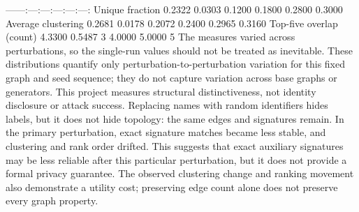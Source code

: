 {}\markdownRendererPipe{}---\markdownRendererPipe{}---:\markdownRendererPipe{}---:\markdownRendererPipe{}---:\markdownRendererPipe{}---:\markdownRendererPipe{}---:\markdownRendererPipe{}---:\markdownRendererPipe{}\markdownRendererSoftLineBreak
{}\markdownRendererPipe{} Unique fraction \markdownRendererPipe{} 0.2322 \markdownRendererPipe{} 0.0303 \markdownRendererPipe{} 0.1200 \markdownRendererPipe{} 0.1800 \markdownRendererPipe{} 0.2800 \markdownRendererPipe{} 0.3000 \markdownRendererPipe{}\markdownRendererSoftLineBreak
{}\markdownRendererPipe{} Average clustering \markdownRendererPipe{} 0.2681 \markdownRendererPipe{} 0.0178 \markdownRendererPipe{} 0.2072 \markdownRendererPipe{} 0.2400 \markdownRendererPipe{} 0.2965 \markdownRendererPipe{} 0.3160 \markdownRendererPipe{}\markdownRendererSoftLineBreak
{}\markdownRendererPipe{} Top-five overlap (count) \markdownRendererPipe{} 4.3300 \markdownRendererPipe{} 0.5487 \markdownRendererPipe{} 3 \markdownRendererPipe{} 4.0000 \markdownRendererPipe{} 5.0000 \markdownRendererPipe{} 5 \markdownRendererPipe{}\markdownRendererParagraphSeparator
{}The measures varied across perturbations, so the single-run values should not be treated as inevitable. These distributions quantify only perturbation-to-perturbation variation for this fixed graph and seed sequence; they do not capture variation across base graphs or generators.\markdownRendererInterblockSeparator
{}
\markdownRendererSectionEnd 
\markdownRendererSectionEnd \markdownRendererSectionBegin
{}\markdownRendererInterblockSeparator
{} This project measures structural distinctiveness, not identity disclosure or attack success.\markdownRendererParagraphSeparator
{}Replacing names with random identifiers hides labels, but it does not hide topology: the same edges and signatures remain. In the primary perturbation, exact signature matches became less stable, and clustering and rank order drifted. This suggests that exact auxiliary signatures may be less reliable after this particular perturbation, but it does not provide a formal privacy guarantee. The observed clustering change and ranking movement also demonstrate a utility cost; preserving edge count alone does not preserve every graph property.\markdownRendererParagraphSeparator
